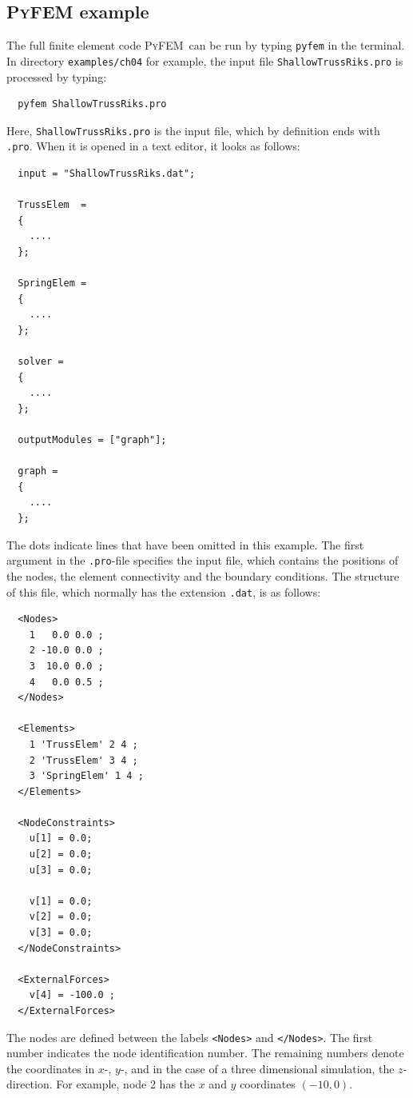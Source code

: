 \documentclass{article}
\newcommand{\progname}{\textsc{PyFEM}}
\newenvironment{graybox}{

\begin{center}\noindent\ignorespaces\begin{Sbox}\begin{minipage}{10cm}}%
{\end{minipage}\end{Sbox}%
\fcolorbox{black}{mygray}{\TheSbox}\vspace{5mm}\ignorespacesafterend\end{center}}
\begin{document}
\subsection*{\textsc{PyFEM} example} 

The full finite element code \progname~can be run by typing \texttt{pyfem} in the terminal. In directory \texttt{examples/ch04} for example,
the input file \texttt{ShallowTrussRiks.pro} is processed by typing:
\begin{verbatim}
  pyfem ShallowTrussRiks.pro
\end{verbatim}
Here, \texttt{ShallowTrussRiks.pro} is the input file, which by definition ends with \texttt{.pro}. When it is
opened in a text editor, it looks as follows:

\begin{graybox}
\begin{verbatim}
  input = "ShallowTrussRiks.dat";

  TrussElem  = 
  {
    ....
  };

  SpringElem =
  {
    ....
  };

  solver =
  {
    ....
  };

  outputModules = ["graph"];

  graph = 
  {
    ....
  };
\end{verbatim}
\end{graybox}
The dots indicate lines that have been omitted in this example.
The first argument in the \texttt{.pro}-file specifies the input file, which contains the positions of 
the nodes, the element connectivity and the boundary conditions. The structure of this file, which normally has 
the extension \texttt{.dat}, is as follows:
\begin{graybox}
\begin{verbatim}
  <Nodes>
    1   0.0 0.0 ;
    2 -10.0 0.0 ;
    3  10.0 0.0 ;
    4   0.0 0.5 ;
  </Nodes>

  <Elements>
    1 'TrussElem' 2 4 ;
    2 'TrussElem' 3 4 ;
    3 'SpringElem' 1 4 ;
  </Elements>

  <NodeConstraints>
    u[1] = 0.0;
    u[2] = 0.0;
    u[3] = 0.0;

    v[1] = 0.0;
    v[2] = 0.0;
    v[3] = 0.0;
  </NodeConstraints>

  <ExternalForces>
    v[4] = -100.0 ;
  </ExternalForces>
\end{verbatim}
\end{graybox}	
The nodes are defined between the labels \texttt{<Nodes>} and \texttt{</Nodes>}. The first number 
indicates the node identification number. The remaining numbers denote the coordinates in $x$-, $y$-, and in the 
case of a three dimensional simulation, the $z$-direction. For example, node 2 has the $x$ and $y$ coordinates $(-10,0)$.
\end{document}

